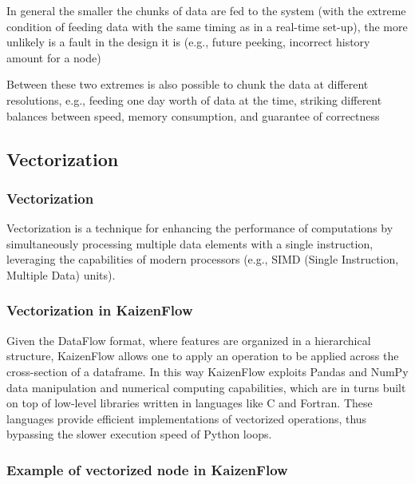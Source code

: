 \documentclass[11pt, reqno]{amsart}
\theoremstyle{definition}
\theoremstyle{remark}
\begin{document}
  In general the smaller the chunks of data are fed to the system (with the
  extreme condition of feeding data with the same timing as in a real-time set-up),
  the more unlikely is a fault in the design it is (e.g., future peeking,
  incorrect history amount for a node)

  Between these two extremes is also possible to chunk the data at different
  resolutions, e.g., feeding one day worth of data at the time, striking
  different balances between speed, memory consumption, and guarantee of
  correctness

  \subsection{Vectorization}

  \subsubsection{Vectorization}
  Vectorization is a technique for enhancing the performance of computations by
  simultaneously processing multiple data elements with a single instruction, leveraging
  the capabilities of modern processors (e.g., SIMD (Single Instruction,
  Multiple Data) units).

  \subsubsection{Vectorization in KaizenFlow}
  Given the DataFlow format, where features are organized in a hierarchical structure,
  KaizenFlow allows one to apply an operation to be applied across the cross-section
  of a dataframe. In this way KaizenFlow exploits Pandas and NumPy data manipulation
  and numerical computing capabilities, which are in turns built on top of low-level
  libraries written in languages like C and Fortran. These languages provide efficient
  implementations of vectorized operations, thus bypassing the slower execution
  speed of Python loops.

  \subsubsection{Example of vectorized node in KaizenFlow}
\end{document}
